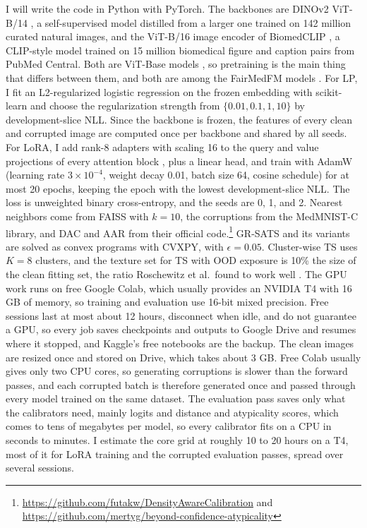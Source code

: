 \documentclass[sigconf,nonacm]{acmart}
\begin{document}
I will write the code in Python with PyTorch. The backbones are DINOv2 ViT-B/14 \cite{oquab2024dinov2}, a self-supervised model distilled from a larger one trained on 142 million curated natural images, and the ViT-B/16 image encoder of BiomedCLIP \cite{zhang2025biomedclip}, a CLIP-style model \cite{radford2021clip} trained on 15 million biomedical figure and caption pairs from PubMed Central. Both are ViT-Base models \cite{dosovitskiy2021vit}, so pretraining is the main thing that differs between them, and both are among the FairMedFM models \cite{jin2024fairmedfm}. For LP, I fit an L2-regularized logistic regression on the frozen embedding with scikit-learn and choose the regularization strength from $\{0.01, 0.1, 1, 10\}$ by development-slice NLL. Since the backbone is frozen, the features of every clean and corrupted image are computed once per backbone and shared by all seeds. For LoRA, I add rank-8 adapters with scaling 16 to the query and value projections of every attention block \cite{hu2022lora}, plus a linear head, and train with AdamW (learning rate $3 \times 10^{-4}$, weight decay 0.01, batch size 64, cosine schedule) for at most 20 epochs, keeping the epoch with the lowest development-slice NLL. The loss is unweighted binary cross-entropy, and the seeds are 0, 1, and 2. Nearest neighbors come from FAISS with $k = 10$, the corruptions from the MedMNIST-C library, and DAC and AAR from their official code.\footnote{\url{https://github.com/futakw/DensityAwareCalibration} and \url{https://github.com/mertyg/beyond-confidence-atypicality}} GR-SATS and its variants are solved as convex programs with CVXPY, with $\epsilon = 0.05$. Cluster-wise TS uses $K = 8$ clusters, and the texture set for TS with OOD exposure is 10\% the size of the clean fitting set, the ratio Roschewitz et al.\ found to work well \cite{roschewitz2025where}. The GPU work runs on free Google Colab, which usually provides an NVIDIA T4 with 16 GB of memory, so training and evaluation use 16-bit mixed precision. Free sessions last at most about 12 hours, disconnect when idle, and do not guarantee a GPU, so every job saves checkpoints and outputs to Google Drive and resumes where it stopped, and Kaggle's free notebooks are the backup. The clean images are resized once and stored on Drive, which takes about 3 GB. Free Colab usually gives only two CPU cores, so generating corruptions is slower than the forward passes, and each corrupted batch is therefore generated once and passed through every model trained on the same dataset. The evaluation pass saves only what the calibrators need, mainly logits and distance and atypicality scores, which comes to tens of megabytes per model, so every calibrator fits on a CPU in seconds to minutes. I estimate the core grid at roughly 10 to 20 hours on a T4, most of it for LoRA training and the corrupted evaluation passes, spread over several sessions.
\end{document}
